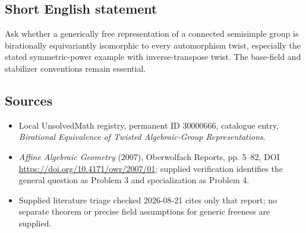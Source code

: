 \documentclass[11pt]{article}
\begin{document}
\subsection{Short English statement}
Ask whether a generically free representation of a connected semisimple group is birationally equivariantly isomorphic to every automorphism twist, especially the stated symmetric-power example with inverse-transpose twist. The base-field and stabilizer conventions remain essential.
\subsection{Sources}
\begin{itemize}
\item Local UnsolvedMath registry, permanent ID 30000666, catalogue entry, \emph{Birational Equivalence of Twisted Algebraic-Group Representations}.
\item \emph{Affine Algebraic Geometry} (2007), Oberwolfach Reports, pp. 5--82, DOI \url{https://doi.org/10.4171/owr/2007/01}; supplied verification identifies the general question as Problem 3 and specialization as Problem 4.
\item Supplied literature triage checked 2026-08-21 cites only that report; no separate theorem or precise field assumptions for generic freeness are supplied.
\end{itemize}
\end{document}
